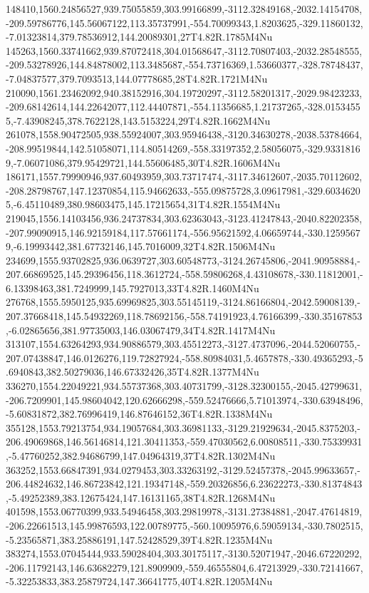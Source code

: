 148410,1560.24856527,939.75055859,303.99166899,-3112.32849168,-2032.14154708,-209.59786776,145.56067122,113.35737991,-554.70099343,1.8203625,-329.11860132,-7.01323814,379.78536912,144.20089301,27T4.82R.1785M4Nu
145263,1560.33741662,939.87072418,304.01568647,-3112.70807403,-2032.28548555,-209.53278926,144.84878002,113.3485687,-554.73716369,1.53660377,-328.78748437,-7.04837577,379.7093513,144.07778685,28T4.82R.1721M4Nu
210090,1561.23462092,940.38152916,304.19720297,-3112.58201317,-2029.98423233,-209.68142614,144.22642077,112.44407871,-554.11356685,1.21737265,-328.01534555,-7.43908245,378.7622128,143.5153224,29T4.82R.1662M4Nu
261078,1558.90472505,938.55924007,303.95946438,-3120.34630278,-2038.53784664,-208.99519844,142.51058071,114.80514269,-558.33197352,2.58056075,-329.93318169,-7.06071086,379.95429721,144.55606485,30T4.82R.1606M4Nu
186171,1557.79990946,937.60493959,303.73717474,-3117.34612607,-2035.70112602,-208.28798767,147.12370854,115.94662633,-555.09875728,3.09617981,-329.60346205,-6.45110489,380.98603475,145.17215654,31T4.82R.1554M4Nu
219045,1556.14103456,936.24737834,303.62363043,-3123.41247843,-2040.82202358,-207.99090915,146.92159184,117.57661174,-556.95621592,4.06659744,-330.12595679,-6.19993442,381.67732146,145.7016009,32T4.82R.1506M4Nu
234699,1555.93702825,936.0639727,303.60548773,-3124.26745806,-2041.90958884,-207.66869525,145.29396456,118.3612724,-558.59806268,4.43108678,-330.11812001,-6.13398463,381.7249999,145.7927013,33T4.82R.1460M4Nu
276768,1555.5950125,935.69969825,303.55145119,-3124.86166804,-2042.59008139,-207.37668418,145.54932269,118.78692156,-558.74191923,4.76166399,-330.35167853,-6.02865656,381.97735003,146.03067479,34T4.82R.1417M4Nu
313107,1554.63264293,934.90886579,303.45512273,-3127.4737096,-2044.52060755,-207.07438847,146.0126276,119.72827924,-558.80984031,5.4657878,-330.49365293,-5.6940843,382.50279036,146.67332426,35T4.82R.1377M4Nu
336270,1554.22049221,934.55737368,303.40731799,-3128.32300155,-2045.42799631,-206.7209901,145.98604042,120.62666298,-559.52476666,5.71013974,-330.63948496,-5.60831872,382.76996419,146.87646152,36T4.82R.1338M4Nu
355128,1553.79213754,934.19057684,303.36981133,-3129.21929634,-2045.8375203,-206.49069868,146.56146814,121.30411353,-559.47030562,6.00808511,-330.75339931,-5.47760252,382.94686799,147.04964319,37T4.82R.1302M4Nu
363252,1553.66847391,934.0279453,303.33263192,-3129.52457378,-2045.99633657,-206.44824632,146.86723842,121.19347148,-559.20326856,6.23622273,-330.81374843,-5.49252389,383.12675424,147.16131165,38T4.82R.1268M4Nu
401598,1553.06770399,933.54946458,303.29819978,-3131.27384881,-2047.47614819,-206.22661513,145.99876593,122.00789775,-560.10095976,6.59059134,-330.7802515,-5.23565871,383.25886191,147.52428529,39T4.82R.1235M4Nu
383274,1553.07045444,933.59028404,303.30175117,-3130.52071947,-2046.67220292,-206.11792143,146.63682279,121.8909909,-559.46555804,6.47213929,-330.72141667,-5.32253833,383.25879724,147.36641775,40T4.82R.1205M4Nu
